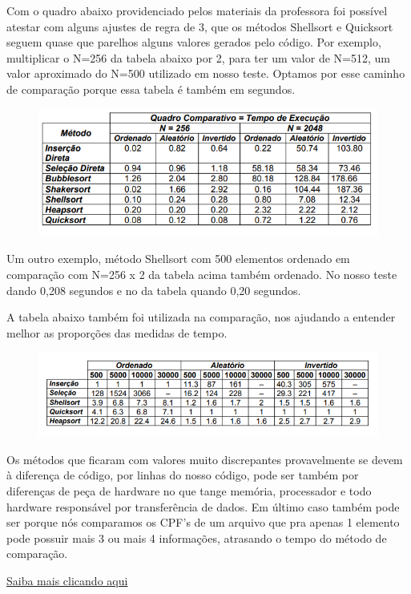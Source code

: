 \documentclass[12pt, a4paper]{FAESATeX}
\begin{document}
    Com o quadro abaixo providenciado pelos materiais da professora foi possível
    atestar com alguns ajustes de regra de 3, que os métodos Shellsort e
    Quicksort seguem quase que parelhos alguns valores gerados pelo código. Por
    exemplo, multiplicar o N=256 da tabela abaixo por 2, para ter um valor de
    N=512, um valor aproximado do N=500 utilizado em nosso teste.  Optamos por
    esse caminho de comparação porque essa tabela é também em segundos. 

    \begin{figure}[h]
        \includegraphics[width=\textwidth]{image5.png}
    \end{figure}

    \fimpagina

    Um outro exemplo, método Shellsort com 500 elementos ordenado em comparação
    com N=256 x 2 da tabela acima também ordenado. No nosso teste dando 0,208
    segundos e no da tabela quando 0,20 segundos.

    A tabela abaixo também foi utilizada na comparação, nos ajudando a entender
    melhor as proporções das medidas de tempo.
            

    \begin{figure}[h]
        \includegraphics[width=\textwidth]{image2.png}
    \end{figure}

    Os métodos que ficaram com valores muito discrepantes provavelmente se devem
    à diferença de código, por linhas do nosso código, pode ser também por
    diferenças de peça de hardware no que tange memória, processador e todo
    hardware responsável por transferência de dados. Em último caso também pode
    ser porque nós comparamos os CPF’s de um arquivo que pra apenas 1 elemento
    pode possuir mais 3 ou mais 4 informações, atrasando o tempo do método de
    comparação.

    \begin{center}
        \href{https://www.github.com/xavier-arthur/faesatex}{\color{blue} Saiba mais clicando aqui}
    \end{center}
\end{document}
